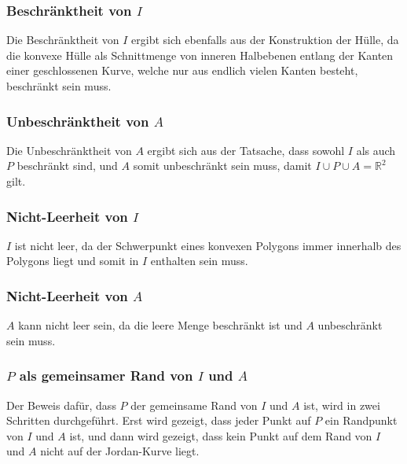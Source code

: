 \subsubsection{Beschränktheit von $I$
\label{jordan:konvex:beschraenktheit_innen}}

Die Beschränktheit von $I$ ergibt sich ebenfalls aus der Konstruktion der Hülle, da die konvexe Hülle als Schnittmenge von inneren Halbebenen entlang der Kanten einer geschlossenen Kurve, welche nur aus endlich vielen Kanten besteht, beschränkt sein muss.

\subsubsection{Unbeschränktheit von $A$
\label{jordan:konvex:unbeschraenktheit_aussen}}

Die Unbeschränktheit von $A$ ergibt sich aus der Tatsache, dass sowohl $I$ als auch $P$ beschränkt sind, und $A$ somit unbeschränkt sein muss, damit $I \cup P \cup A = \mathbb{R}^2$ gilt.

\subsubsection{Nicht-Leerheit von $I$
\label{jordan:konvex:nichtleerheit_innen}}

$I$ ist nicht leer, da der Schwerpunkt eines konvexen Polygons immer innerhalb des Polygons liegt und somit in $I$ enthalten sein muss.

\subsubsection{Nicht-Leerheit von $A$
\label{jordan:konvex:nichtleerheit_aussen}}

$A$ kann nicht leer sein, da die leere Menge beschränkt ist und $A$ unbeschränkt sein muss.

\subsubsection{$P$ als gemeinsamer Rand von $I$ und $A$
\label{jordan:konvex:gemeinsamer_rand}}

Der Beweis dafür, dass $P$ der gemeinsame Rand von $I$ und $A$ ist, wird in zwei Schritten durchgeführt.
Erst wird gezeigt, dass jeder Punkt auf $P$ ein Randpunkt von $I$ und $A$ ist, und dann wird gezeigt, dass kein Punkt auf dem Rand von $I$ und $A$ nicht auf der Jordan-Kurve liegt.


